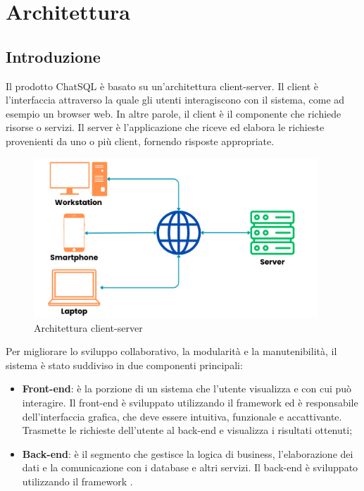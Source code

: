 \section{Architettura}

\subsection{Introduzione}
\par Il prodotto ChatSQL è basato su un'architettura client-server. Il client è l'interfaccia attraverso la quale gli utenti interagiscono con il sistema, come ad esempio un browser web. In altre parole, il client è il componente che richiede risorse o servizi. Il server è l'applicazione che riceve ed elabora le richieste provenienti da uno o più client, fornendo risposte appropriate.

\begin{figure}[H]
  \centering
  \includegraphics[width=0.95\textwidth]{assets/client_server.png}
  \caption{Architettura client-server}
\end{figure}

\par Per migliorare lo sviluppo collaborativo, la modularità e la manutenibilità, il sistema è stato suddiviso in due componenti principali:
\begin{itemize}
  \item \textbf{Front-end}: è la porzione di un sistema che l'utente visualizza e con cui può interagire. Il front-end è sviluppato utilizzando il framework  ed è responsabile dell'interfaccia grafica, che deve essere intuitiva, funzionale e accattivante. Trasmette le richieste dell'utente al back-end e visualizza i risultati ottenuti;
  \item \textbf{Back-end}: è il segmento che gestisce la logica di business, l'elaborazione dei dati e la comunicazione con i database e altri servizi. Il back-end è sviluppato utilizzando il framework .
\end{itemize}

